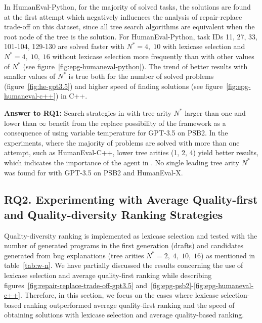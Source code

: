 In HumanEval-Python, for the majority of solved tasks, the solutions are found at the first attempt which negatively influences the analysis of repair-replace trade-off on this dataset, since all tree search algorithms are equivalent when the root node of the tree is the solution.
For HumanEval-Python, task IDs 11, 27, 33, 101-104, 129-130 are solved faster with $N^*=4, \; 10$ with lexicase selection and $N^*=4, \; 10, \; 16$ without lexicase selection more frequently than with other values of $N^*$ (see figure~\ref{fig:epg-humaneval-python}).
The trend of better results with smaller values of $N^*$ is true both for the number of solved problems (figure~\ref{fig:he-gpt3.5}) and higher speed of finding solutions (see figure~\ref{fig:epg-humaneval-c++}) in C++.

\begin{highlight}
\textbf{Answer to RQ1:} 
Search strategies in \method{} with tree arity $N^*$ larger than one and lower than $\infty$ benefit from the replace possibility of the \method{} framework as a consequence of using variable temperature for GPT-3.5 on PSB2.
In the experiments, where the majority of problems are solved with more than one attempt, such as HumanEval-C++, lower tree arities (1, 2, 4) yield better results, which indicates the importance of the \debug{} agent in \method{}. 
No single leading tree arity $N^*$ was found for \method{} with GPT-3.5 on PSB2 and HumanEval-X.
\end{highlight}

\subsection{RQ2. Experimenting with Average Quality-first and Quality-diversity Ranking Strategies}
\label{sec:lexicase-results}

Quality-diversity ranking is implemented as lexicase selection and tested with the number of generated programs in the first generation (drafts) and candidates generated from bug explanations (tree arities $N^*=2,\; 4, \; 10, \; 16$) as mentioned in table~\ref{tab:w-n}.
We have partially discussed the results concerning the use of lexicase selection and average quality-first ranking while describing figures~\ref{fig:repair-replace-trade-off-gpt3.5} and~\ref{fig:epg-psb2}-\ref{fig:epg-humaneval-c++}. 
Therefore, in this section, we focus on the cases where lexicase selection-based ranking outperformed average quality-first ranking and the speed of obtaining solutions with lexicase selection and average quality-based ranking.

